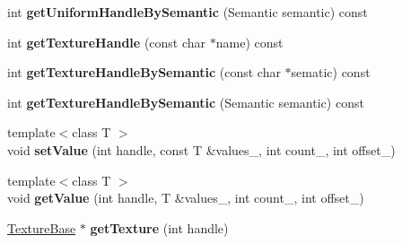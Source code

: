 \begin{DoxyCompactItemize}
\item 
int {\bfseries get\+Uniform\+Handle\+By\+Semantic} (Semantic semantic) const \hypertarget{class_i_dream_sky_1_1_visual_effect_1_1_data_a839aa5ac1ea19aad590aeb42ca08f841}{}\label{class_i_dream_sky_1_1_visual_effect_1_1_data_a839aa5ac1ea19aad590aeb42ca08f841}

\item 
int {\bfseries get\+Texture\+Handle} (const char $\ast$name) const \hypertarget{class_i_dream_sky_1_1_visual_effect_1_1_data_afce5a2fde42170cbecef2a7368a02219}{}\label{class_i_dream_sky_1_1_visual_effect_1_1_data_afce5a2fde42170cbecef2a7368a02219}

\item 
int {\bfseries get\+Texture\+Handle\+By\+Semantic} (const char $\ast$sematic) const \hypertarget{class_i_dream_sky_1_1_visual_effect_1_1_data_a5dde6c274c28eb3e65d0be3c7c0fc8df}{}\label{class_i_dream_sky_1_1_visual_effect_1_1_data_a5dde6c274c28eb3e65d0be3c7c0fc8df}

\item 
int {\bfseries get\+Texture\+Handle\+By\+Semantic} (Semantic semantic) const \hypertarget{class_i_dream_sky_1_1_visual_effect_1_1_data_a75e00fed28b04b42b6d0f8a8e6c3480f}{}\label{class_i_dream_sky_1_1_visual_effect_1_1_data_a75e00fed28b04b42b6d0f8a8e6c3480f}

\item 
{\footnotesize template$<$class T $>$ }\\void {\bfseries set\+Value} (int handle, const T \&values\+\_\+, int count\+\_, int offset\+\_)\hypertarget{class_i_dream_sky_1_1_visual_effect_1_1_data_ac34c8f9bed24e94416d42ad205ca49e3}{}\label{class_i_dream_sky_1_1_visual_effect_1_1_data_ac34c8f9bed24e94416d42ad205ca49e3}

\item 
{\footnotesize template$<$class T $>$ }\\void {\bfseries get\+Value} (int handle, T \&values\+\_\+, int count\+\_, int offset\+\_)\hypertarget{class_i_dream_sky_1_1_visual_effect_1_1_data_a60a9dba518a830a578339ab99b381063}{}\label{class_i_dream_sky_1_1_visual_effect_1_1_data_a60a9dba518a830a578339ab99b381063}

\item 
\hyperlink{class_i_dream_sky_1_1_texture_base}{Texture\+Base} $\ast$ {\bfseries get\+Texture} (int handle)\hypertarget{class_i_dream_sky_1_1_visual_effect_1_1_data_afd537ac76303e169ecb56e37c4121c74}{}\label{class_i_dream_sky_1_1_visual_effect_1_1_data_afd537ac76303e169ecb56e37c4121c74}


\end{DoxyCompactItemize}
